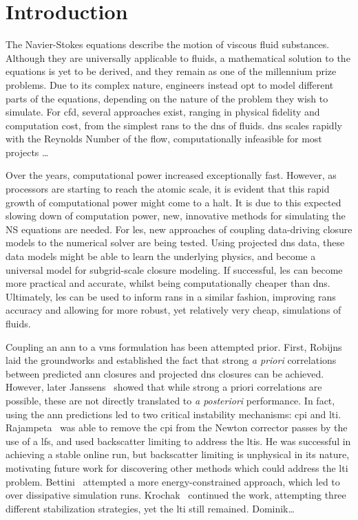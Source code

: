\chapter{Introduction} \label{ch:introduction}

The Navier-Stokes equations describe the motion of viscous fluid substances. Although they are universally applicable to fluids, a mathematical solution to the equations is yet to be derived, and they remain as one of the millennium prize problems. Due to its complex nature, engineers instead opt to model different parts of the equations, depending on the nature of the problem they wish to simulate. For \gls{cfd}, several approaches exist, ranging in physical fidelity and computation cost, from the simplest \gls{rans} to the \gls{dns} of fluids. \gls{dns} scales rapidly with the Reynolds Number of the flow, computationally infeasible for most projects \ldots

Over the years, computational power increased exceptionally fast. However, as processors are starting to reach the atomic scale, it is evident that this rapid growth of computational power might come to a halt. It is due to this expected slowing down of computation power, new, innovative methods for simulating the NS equations are needed. For \gls{les}, new approaches of coupling data-driving closure models to the numerical solver are being tested. Using projected \gls{dns} data, these data models might be able to learn the underlying physics, and become a universal model for subgrid-scale closure modeling. If successful, \gls{les} can become more practical and accurate, whilst being computationally cheaper than \gls{dns}. Ultimately, \gls{les} can be used to inform \gls{rans} in a similar fashion, improving \gls{rans} accuracy and allowing for more robust, yet relatively very cheap, simulations of fluids.

Coupling an \gls{ann} to a \gls{vms} formulation has been attempted prior. First, Robijns~\cite{Robijns2019} laid the groundworks and established the fact that strong \emph{a priori} correlations between predicted \gls{ann} closures and projected \gls{dns} closures can be achieved. However, later Janssens~\cite{Janssens2019} showed that while strong a priori correlations are possible, these are not directly translated to \emph{a posteriori} performance. In fact, using the \gls{ann} predictions led to two critical instability mechanisms: \gls{cpi} and \gls{lti}. Rajampeta~\cite{Rajampeta2021} was able to remove the \gls{cpi} from the Newton corrector passes by the use of a \gls{lfs}, and used backscatter limiting to address the \gls{lti}s. He was successful in achieving a stable online run, but backscatter limiting is unphysical in its nature, motivating future work for discovering other methods which could address the \gls{lti} problem. Bettini~\cite{Bettini2023} attempted a more energy-constrained approach, which led to over dissipative simulation runs. Krochak~\cite{Krochak2024} continued the work, attempting three different stabilization strategies, yet the \gls{lti} still remained. Dominik\ldots {}

